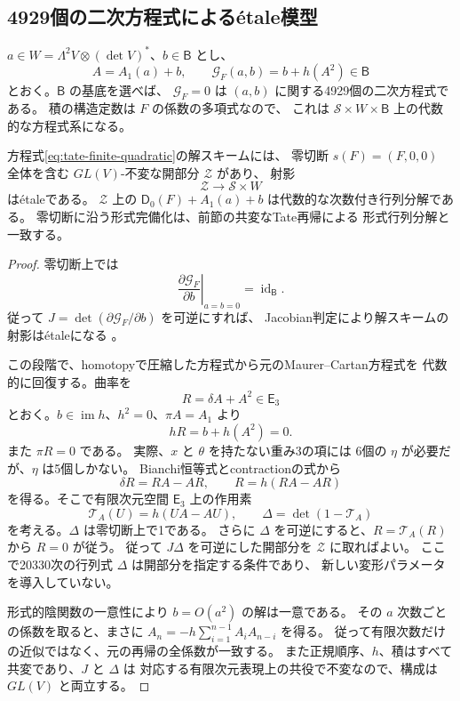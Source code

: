 \subsection{4929個の二次方程式による\'etale模型}

$a\in W=\Lambda^2V\otimes(\det V)^*$、$b\in\mathsf B$ とし、
\[
 A=A_1(a)+b,\qquad
 \mathcal G_F(a,b)=b+h(A^2)\in\mathsf B
 \tag{A2}\label{eq:tate-finite-quadratic}
\]
とおく。$\mathsf B$ の基底を選べば、
$\mathcal G_F=0$ は $(a,b)$ に関する4929個の二次方程式である。
積の構造定数は $F$ の係数の多項式なので、
これは $\mathcal S\times W\times\mathsf B$ 上の代数的な方程式系になる。

\begin{theorem}[全次数のTate模型の代数化]
\label{thm:tate-algebraization}
方程式\eqref{eq:tate-finite-quadratic}の解スキームには、
零切断 $s(F)=(F,0,0)$ 全体を含む $GL(V)$-不変な開部分 $\mathcal Z$ があり、
射影
\[
 \mathcal Z\longrightarrow\mathcal S\times W
\]
は\'etaleである。
$\mathcal Z$ 上の $\mathsf D_0(F)+A_1(a)+b$ は代数的な次数付き行列分解である。
零切断に沿う形式完備化は、前節の共変なTate再帰による
形式行列分解と一致する。
\end{theorem}
\begin{proof}
零切断上では
\[
 \left.\frac{\partial\mathcal G_F}{\partial b}\right|_{a=b=0}
       =\operatorname{id}_{\mathsf B}.
\]
従って $J=\det(\partial\mathcal G_F/\partial b)$ を可逆にすれば、
Jacobian判定により解スキームの射影は\'etaleになる
\cite[Proposition 59.26.2(3)]{StacksEtaleCriterion}。

この段階で、homotopyで圧縮した方程式から元のMaurer--Cartan方程式を
代数的に回復する。曲率を
\[
 R=\delta A+A^2\in\mathsf E_3
\]
とおく。$b\in\operatorname{im}h$、$h^2=0$、$\pi A=A_1$ より
\[
 hR=b+h(A^2)=0.
\]
また $\pi R=0$ である。
実際、$x$ と $\theta$ を持たない重み3の項には
6個の $\eta$ が必要だが、$\eta$ は5個しかない。
Bianchi恒等式とcontractionの式から
\[
 \delta R=RA-AR,\qquad R=h(RA-AR)
\]
を得る。そこで有限次元空間 $\mathsf E_3$ 上の作用素
\[
 \mathcal T_A(U)=h(UA-AU),\qquad
 \Delta=\det(1-\mathcal T_A)
\]
を考える。$\Delta$ は零切断上で1である。
さらに $\Delta$ を可逆にすると、$R=\mathcal T_A(R)$ から $R=0$ が従う。
従って $J\Delta$ を可逆にした開部分を $\mathcal Z$ に取ればよい。
ここで20330次の行列式 $\Delta$ は開部分を指定する条件であり、
新しい変形パラメータを導入していない。

形式的陰関数の一意性により $b=O(a^2)$ の解は一意である。
その $a$ 次数ごとの係数を取ると、まさに
$A_n=-h\sum_{i=1}^{n-1}A_iA_{n-i}$ を得る。
従って有限次数だけの近似ではなく、元の再帰の全係数が一致する。
また正規順序、$h$、積はすべて共変であり、$J$ と $\Delta$ は
対応する有限次元表現上の共役で不変なので、構成は $GL(V)$ と両立する。
\end{proof}

